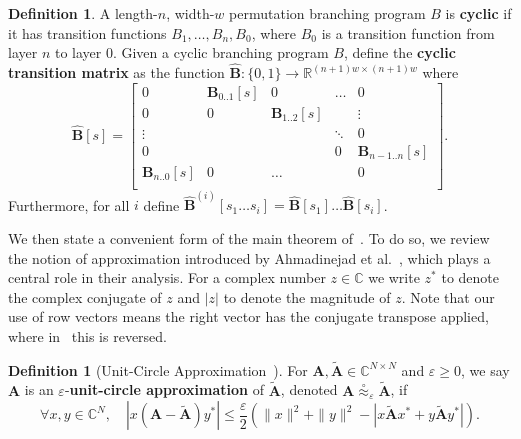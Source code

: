 \documentclass[11pt]{article}
\numberwithin{equation}{section}
\theoremstyle{definition}
\newtheorem{definition}[theorem]{Definition}
\theoremstyle{plain}
\newcommand{\C}{\mathbb C}
\newcommand{\R}{\mathbb R}
\newcommand{\eps}{\varepsilon}
\newcommand{\zo}{\{0,1\}}
\newcommand{\ra}{\rightarrow}
\newcommand{\mA}{\mathbf{A}}
\newcommand{\mtA}{\widetilde{\mA}}
\newcommand{\bp}{{\mathbf{B}}}
\newcommand{\hbp}{{\mathbf{\hat{B}}}}
\newcommand{\uc}{\stackrel{\circ}{\approx}}
\begin{document}
\begin{definition}
    A length-$n$, width-$w$ permutation branching program $B$ is \textbf{cyclic} if it has transition functions $B_1,\ldots,B_n,B_0$, where $B_0$ is a transition function from layer $n$ to layer $0$. Given a cyclic branching program $B$, define the \textbf{cyclic transition matrix} as the function $\hbp:\zo\ra \R^{(n+1)w\times(n+1)w}$ where
    \[\hbp[s] = \begin{bmatrix}
    0 & \bp_{0..1}[s] & 0 & \dots & 0\\
    0 & 0 & \bp_{1..2}[s] &  & \vdots\\
    \vdots & &  & \ddots & 0\\
    0 & ~ &   & 0 & \bp_{n-1..n}[s]\\
    \bp_{n..0}[s] & 0 & \dots & & 0\\
    \end{bmatrix}.\]
    Furthermore, for all $i$ define $\hbp^{(i)}[s_1\dots s_i]=\hbp[s_1]\dots\hbp[s_i]$.
\end{definition}
    
We then state a convenient form of the main theorem of~\cite{HozaPyVa21}. To do so, we review the notion of approximation introduced by Ahmadinejad et al.~\cite{AhmadinejadKeMuPeSiVa19}, which plays a central role in their analysis.
For a complex number $z \in \C$ we write $z^*$ to denote the complex conjugate of $z$ and $|z|$ to denote the magnitude of $z$. Note that our use of row vectors means the right vector has the conjugate transpose applied, where in~\cite{AhmadinejadKeMuPeSiVa19} this is reversed.

\begin{definition}[Unit-Circle Approximation~\cite{AhmadinejadKeMuPeSiVa19}]
    For $\mA,\mtA \in \C^{N\times N}$ and $\eps\geq 0$, we say $\mA$ is an $\eps$-\textbf{unit-circle approximation} of $\mtA$, denoted $\mA\uc_\eps \mtA$, if
    \[ \forall x,y \in \C^N, \quad \left|x(\mA-\mtA)y^*\right| \leq \frac{\eps}{2}\left(\|x\|^2+\|y\|^2-\left|x\mtA x^*+y\mtA y^*\right|\right).\]
\end{definition}
    
\end{document}
